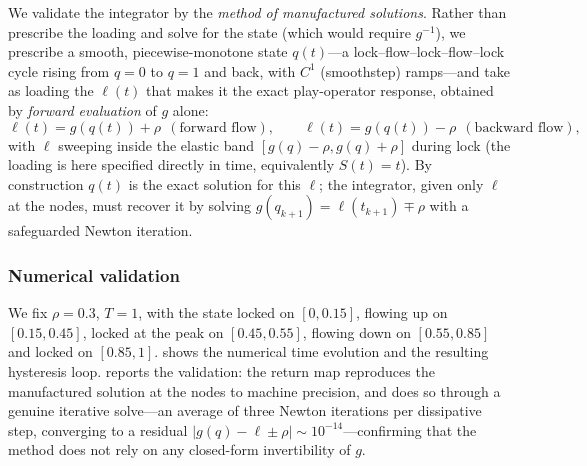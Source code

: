 We validate the integrator by the \emph{method of manufactured
solutions}. Rather than prescribe the loading and solve for the state
(which would require $g^{-1}$), we prescribe a smooth, piecewise-monotone
state $q(t)$---a lock--flow--lock--flow--lock cycle rising from $q=0$ to
$q=1$ and back, with $C^1$ (smoothstep) ramps---and take as loading the
$\ell(t)$ that makes it the exact play-operator response, obtained by
\emph{forward evaluation} of $g$ alone:
\begin{equation}\label{eq:manufactured}
  \ell(t)=g(q(t))+\rho \ \ (\text{forward flow}),
  \qquad
  \ell(t)=g(q(t))-\rho \ \ (\text{backward flow}),
\end{equation}
with $\ell$ sweeping inside the elastic band $[g(q)-\rho,g(q)+\rho]$
during lock (the loading is here specified directly in time, equivalently
$S(t)=t$). By construction $q(t)$ is the exact solution for this $\ell$;
the integrator, given only $\ell$ at the nodes, must recover it by solving
$g(q_{k+1})=\ell(t_{k+1})\mp\rho$ with a safeguarded Newton iteration.

\subsubsection{Numerical validation}\label{sec:regimes3}

We fix $\rho=0.3$, $T=1$, with the state locked on $[0,0.15]$, flowing up
on $[0.15,0.45]$, locked at the peak on $[0.45,0.55]$, flowing down on
$[0.55,0.85]$ and locked on $[0.85,1]$.  shows the
numerical time evolution and the resulting hysteresis loop.
 reports the validation: the return map reproduces the
manufactured solution at the nodes to machine precision, and does so
through a genuine iterative solve---an average of three Newton iterations
per dissipative step, converging to a residual
$|g(q)-\ell\pm\rho|\sim10^{-14}$---confirming that the method does not
rely on any closed-form invertibility of $g$.

